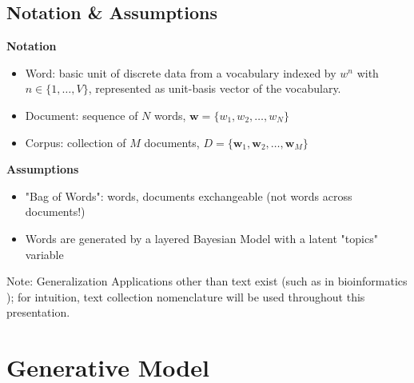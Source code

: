 \documentclass[aspectratio=169]{beamer}
\begin{document}
\subsection{Notation \& Assumptions}
\begin{frame}{\insertsubsectionhead}
  
  \textbf{Notation}
  \begin{itemize} 
    \item Word: basic unit of discrete data from a vocabulary indexed by $w^n$ with $n \in \{1, \dots, V\}$, represented as unit-basis vector of the vocabulary.
    \item Document: sequence of $N$ words, $\bm{w} = \{w_1, w_2, \dots, w_N\}$
    \item Corpus: collection of $M$ documents, $D = \{\bm{w}_1, \bm{w}_2, \dots, \bm{w}_M\}$
  \end{itemize}
  \textbf{Assumptions}
  \begin{itemize}
    \item "Bag of Words": words, documents exchangeable (not words across documents!)
    \item Words are generated by a layered Bayesian Model with a latent "topics" variable 
  \end{itemize}
  \begin{exampleblock}{Note: Generalization}
    Applications other than text exist (such as in bioinformatics \cite{BIOLDA} \cite{liu2016overview} \cite{ldabioinformatics}); for intuition, text collection nomenclature will be used throughout this presentation.
  \end{exampleblock}
\end{frame}

\section{Generative Model}
\end{document}
